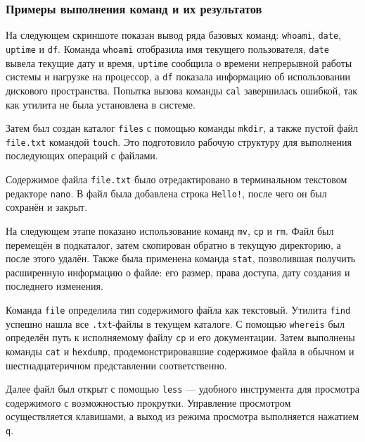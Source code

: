 \subsubsection*{Примеры выполнения команд и их результатов}

На следующем скриншоте показан вывод ряда базовых команд: \texttt{whoami}, \texttt{date}, \texttt{uptime} и \texttt{df}. Команда \texttt{whoami} отобразила имя текущего пользователя, \texttt{date} вывела текущие дату и время, \texttt{uptime} сообщила о времени непрерывной работы системы и нагрузке на процессор, а \texttt{df} показала информацию об использовании дискового пространства. Попытка вызова команды \texttt{cal} завершилась ошибкой, так как утилита не была установлена в системе.

Затем был создан каталог \texttt{files} с помощью команды \texttt{mkdir}, а также пустой файл \texttt{file.txt} командой \texttt{touch}. Это подготовило рабочую структуру для выполнения последующих операций с файлами.

Содержимое файла \texttt{file.txt} было отредактировано в терминальном текстовом редакторе \texttt{nano}. В файл была добавлена строка \texttt{Hello!}, после чего он был сохранён и закрыт.

На следующем этапе показано использование команд \texttt{mv}, \texttt{cp} и \texttt{rm}. Файл был перемещён в подкаталог, затем скопирован обратно в текущую директорию, а после этого удалён. Также была применена команда \texttt{stat}, позволившая получить расширенную информацию о файле: его размер, права доступа, дату создания и последнего изменения.

Команда \texttt{file} определила тип содержимого файла как текстовый. Утилита \texttt{find} успешно нашла все \texttt{.txt}-файлы в текущем каталоге. С помощью \texttt{whereis} был определён путь к исполняемому файлу \texttt{cp} и его документации. Затем выполнены команды \texttt{cat} и \texttt{hexdump}, продемонстрировавшие содержимое файла в обычном и шестнадцатеричном представлении соответственно.

Далее файл был открыт с помощью \texttt{less} — удобного инструмента для просмотра содержимого с возможностью прокрутки. Управление просмотром осуществляется клавишами, а выход из режима просмотра выполняется нажатием \texttt{q}.

